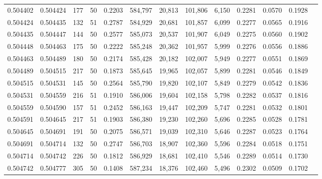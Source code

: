 \begin{tabular}{rrrrrrrrrrrrr}
0.504402 & 0.504424 & 177 &  50 &                                     0.2203 & 584,797 &  20,813 & 101,806 &   6,150 & 0.2281 & 0.0570 & 0.1928 \\
0.504424 & 0.504435 & 132 &  51 &                                     0.2787 & 584,929 &  20,681 & 101,857 &   6,099 & 0.2277 & 0.0565 & 0.1916 \\
0.504435 & 0.504447 & 144 &  50 &                                     0.2577 & 585,073 &  20,537 & 101,907 &   6,049 & 0.2275 & 0.0560 & 0.1902 \\
0.504448 & 0.504463 & 175 &  50 &                                     0.2222 & 585,248 &  20,362 & 101,957 &   5,999 & 0.2276 & 0.0556 & 0.1886 \\
0.504463 & 0.504489 & 180 &  50 &                                     0.2174 & 585,428 &  20,182 & 102,007 &   5,949 & 0.2277 & 0.0551 & 0.1869 \\
0.504489 & 0.504515 & 217 &  50 &                                     0.1873 & 585,645 &  19,965 & 102,057 &   5,899 & 0.2281 & 0.0546 & 0.1849 \\
0.504515 & 0.504531 & 145 &  50 &                                     0.2564 & 585,790 &  19,820 & 102,107 &   5,849 & 0.2279 & 0.0542 & 0.1836 \\
0.504531 & 0.504559 & 216 &  51 &                                     0.1910 & 586,006 &  19,604 & 102,158 &   5,798 & 0.2282 & 0.0537 & 0.1816 \\
0.504559 & 0.504590 & 157 &  51 &                                     0.2452 & 586,163 &  19,447 & 102,209 &   5,747 & 0.2281 & 0.0532 & 0.1801 \\
0.504591 & 0.504645 & 217 &  51 &                                     0.1903 & 586,380 &  19,230 & 102,260 &   5,696 & 0.2285 & 0.0528 & 0.1781 \\
0.504645 & 0.504691 & 191 &  50 &                                     0.2075 & 586,571 &  19,039 & 102,310 &   5,646 & 0.2287 & 0.0523 & 0.1764 \\
0.504691 & 0.504714 & 132 &  50 &                                     0.2747 & 586,703 &  18,907 & 102,360 &   5,596 & 0.2284 & 0.0518 & 0.1751 \\
0.504714 & 0.504742 & 226 &  50 &                                     0.1812 & 586,929 &  18,681 & 102,410 &   5,546 & 0.2289 & 0.0514 & 0.1730 \\
0.504742 & 0.504777 & 305 &  50 &                                     0.1408 & 587,234 &  18,376 & 102,460 &   5,496 & 0.2302 & 0.0509 & 0.1702 \\

\end{tabular}
